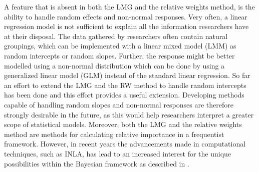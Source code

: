 A feature that is absent in both the LMG and the relative weights method, is the ability to handle random effects and non-normal responses.
Very often, a linear regression model is not sufficient to explain all the information researchers have at their disposal.
The data gathered by researchers often contain natural groupings, which can be implemented with a linear mixed model (LMM) as random intercepts or random slopes.
Further, the response might be better modelled using a non-normal distribution which can be done by using a generalized linear model (GLM) instead of the standard linear regression.
So far an effort to extend the LMG and the RW method to handle random intercepts has been done \citep{matre} and this effort provides a useful extension.
Developing methods capable of handling random slopes and non-normal responses are therefore strongly desirable in the future, as this would help researchers interpret a greater scope of statistical models.
\newline
\newline 
Moreover, both the LMG and the relative weights method are methods for calculating relative importance in a frequentist framework. 
However, in recent years the advancements made in computational techniques, such as INLA, has lead to an increased interest for the unique possibilities within the Bayesian framework as described in \citet{mcelreath2020statistical}.
